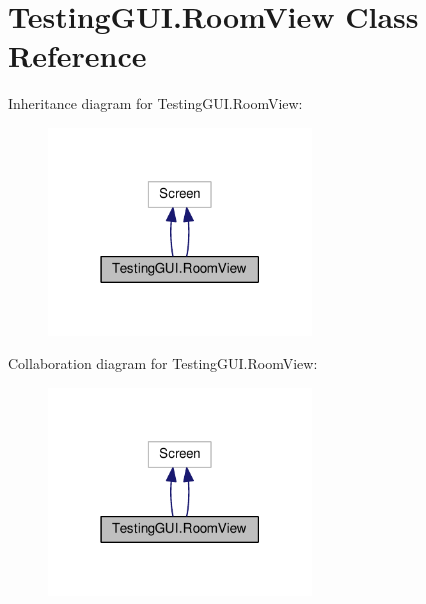 \hypertarget{classTestingGUI_1_1RoomView}{}\section{Testing\+G\+U\+I.\+Room\+View Class Reference}
\label{classTestingGUI_1_1RoomView}


Inheritance diagram for Testing\+G\+U\+I.\+Room\+View\+:\nopagebreak
\begin{figure}[H]
\begin{center}
\leavevmode
\includegraphics[width=198pt]{classTestingGUI_1_1RoomView__inherit__graph}
\end{center}
\end{figure}


Collaboration diagram for Testing\+G\+U\+I.\+Room\+View\+:\nopagebreak
\begin{figure}[H]
\begin{center}
\leavevmode
\includegraphics[width=198pt]{classTestingGUI_1_1RoomView__coll__graph}
\end{center}
\end{figure}
